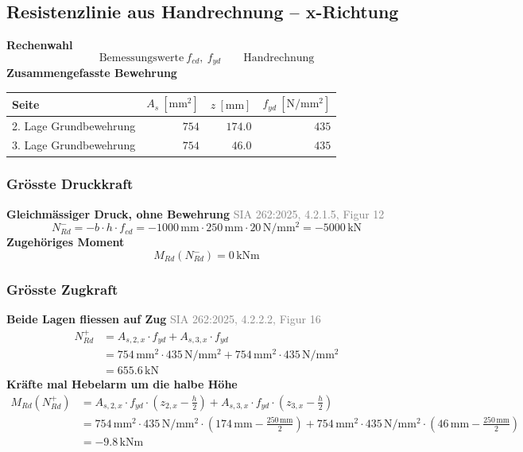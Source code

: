 \documentclass[11pt,a4paper]{article}
\newcommand{\normref}[1]{{\small\textcolor{gray}{#1}}}
\begin{document}
\subsection{Resistenzlinie aus Handrechnung – x-Richtung}
\noindent\textbf{Rechenwahl}
\begin{equation*}
\text{Bemessungswerte}\ f_{cd},\ f_{yd} \qquad \text{Handrechnung}
\end{equation*}
\noindent\textbf{Zusammengefasste Bewehrung}
\begin{longtable}{lrrr}
\hline
Seite & $A_s\ [\mathrm{mm}^2]$ & $z\ [\mathrm{mm}]$ & $f_{yd}\ [\mathrm{N/mm^2}]$ \\
\hline
\endhead
2. Lage Grundbewehrung & $754$ & $174.0$ & $435$ \\
3. Lage Grundbewehrung & $754$ & $46.0$ & $435$ \\
\hline
\end{longtable}
\subsubsection{Grösste Druckkraft}
\noindent\textbf{Gleichmässiger Druck, ohne Bewehrung} \hfill \normref{SIA 262:2025, 4.2.1.5, Figur 12}
\begin{equation*}
N_{Rd}^{-} = -b \cdot h \cdot f_{cd} = -1000\,\mathrm{mm} \cdot 250\,\mathrm{mm} \cdot 20\,\mathrm{N}/\mathrm{mm}^{2} = -5000\,\mathrm{kN}
\end{equation*}
\noindent\textbf{Zugehöriges Moment}
\begin{equation*}
M_{Rd}(N_{Rd}^{-}) = 0\,\mathrm{kNm}
\end{equation*}
\subsubsection{Grösste Zugkraft}
\noindent\textbf{Beide Lagen fliessen auf Zug} \hfill \normref{SIA 262:2025, 4.2.2.2, Figur 16}
\begin{equation*}
\begin{aligned}
  N_{Rd}^{+} &= A_{s,2,x} \cdot f_{yd} + A_{s,3,x} \cdot f_{yd} \\
  &= 754\,\mathrm{mm}^{2} \cdot 435\,\mathrm{N}/\mathrm{mm}^{2} + 754\,\mathrm{mm}^{2} \cdot 435\,\mathrm{N}/\mathrm{mm}^{2} \\
  &= 655.6\,\mathrm{kN}
\end{aligned}
\end{equation*}
\noindent\textbf{Kräfte mal Hebelarm um die halbe Höhe}
\begin{equation*}
\begin{aligned}
  M_{Rd}(N_{Rd}^{+}) &= A_{s,2,x} \cdot f_{yd} \cdot \left(z_{2,x} - \tfrac{h}{2}\right) + A_{s,3,x} \cdot f_{yd} \cdot \left(z_{3,x} - \tfrac{h}{2}\right) \\
  &= 754\,\mathrm{mm}^{2} \cdot 435\,\mathrm{N}/\mathrm{mm}^{2} \cdot \left(174\,\mathrm{mm} - \tfrac{250\,\mathrm{mm}}{2}\right) + 754\,\mathrm{mm}^{2} \cdot 435\,\mathrm{N}/\mathrm{mm}^{2} \cdot \left(46\,\mathrm{mm} - \tfrac{250\,\mathrm{mm}}{2}\right) \\
  &= -9.8\,\mathrm{kNm}
\end{aligned}
\end{equation*}
\end{document}
